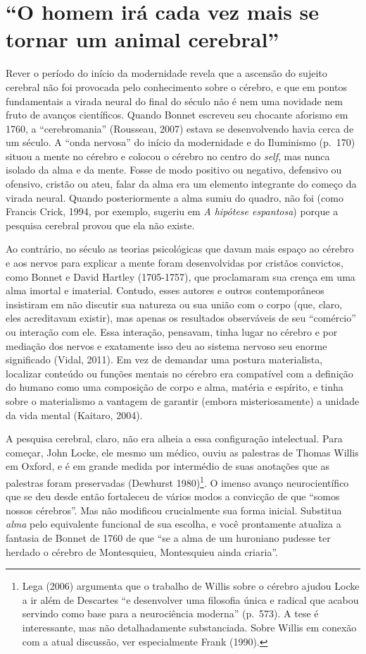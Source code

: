 \section{``O homem irá cada vez mais se tornar um animal cerebral''}

Rever o período do início da modernidade revela que a ascensão do
sujeito cerebral não foi provocada pelo conhecimento sobre o cérebro, e
que em pontos fundamentais a virada neural do final do século  não é
nem uma novidade nem fruto de avanços científicos. Quando Bonnet
escreveu seu chocante aforismo em 1760, a ``cerebromania'' (Rousseau,
2007) estava se desenvolvendo havia cerca de um século. A ``onda
nervosa'' do início da modernidade e do Iluminismo (p.~170) situou a
mente no cérebro e colocou o cérebro no centro do \emph{self}, mas nunca
isolado da alma e da mente. Fosse de modo positivo ou negativo,
defensivo ou ofensivo, cristão ou ateu, falar da alma era um elemento
integrante do começo da virada neural. Quando posteriormente a alma
sumiu do quadro, não foi (como Francis Crick, 1994, por exemplo, sugeriu
em \emph{A hipótese espantosa}) porque a pesquisa cerebral provou que
ela não existe.

Ao contrário, no século  as teorias psicológicas que davam mais
espaço ao cérebro e aos nervos para explicar a mente foram desenvolvidas
por cristãos convictos, como Bonnet e David Hartley (1705-1757), que
proclamaram sua crença em uma alma imortal e imaterial. Contudo, esses
autores e outros contemporâneos insistiram em não discutir sua natureza
ou sua união com o corpo (que, claro, eles acreditavam existir), mas
apenas os resultados observáveis de seu ``comércio'' ou interação com
ele. Essa interação, pensavam, tinha lugar no cérebro e por mediação dos
nervos e exatamente isso deu ao sistema nervoso seu enorme significado
(Vidal, 2011). Em vez de demandar uma postura materialista, localizar
conteúdo ou funções mentais no cérebro era compatível com a definição do
humano como uma composição de corpo e alma, matéria e espírito, e tinha
sobre o materialismo a vantagem de garantir (embora misteriosamente) a
unidade da vida mental (Kaitaro, 2004).

A pesquisa cerebral, claro, não era alheia a essa configuração
intelectual. Para começar, John Locke, ele mesmo um médico, ouviu as
palestras de Thomas Willis em Oxford, e é em grande medida por
intermédio de suas anotações que as palestras foram preservadas
(Dewhurst 1980)\footnote[9]{Lega (2006) argumenta que o trabalho de Willis sobre o cérebro
ajudou Locke a ir além de Descartes ``e desenvolver uma filosofia única
e radical que acabou servindo como base para a neurociência moderna''
(p.~573). A tese é interessante, mas não detalhadamente substanciada.
Sobre Willis em conexão com a atual discussão, ver especialmente Frank
(1990).}. O imenso avanço neurocientífico que
se deu desde então fortaleceu de vários modos a convicção de que ``somos
nossos cérebros''. Mas não modificou crucialmente sua forma inicial.
Substitua \emph{alma} pelo equivalente funcional de sua escolha, e você
prontamente atualiza a fantasia de Bonnet de 1760 de que ``se a alma de
um huroniano pudesse ter herdado o cérebro de Montesquieu, Montesquieu
ainda criaria''.

